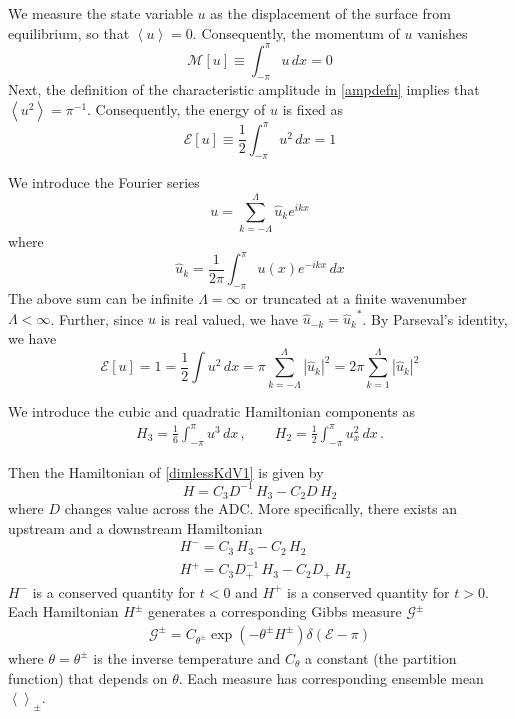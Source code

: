 \documentclass[11pt]{article}
\newcommand{\abs}[1]{\left| #1 \right|}
\newcommand{\mean}[1]{\left< #1 \right>}
\newcommand{\dx}{\, dx}
\newcommand{\drat}{D}
\newcommand{\dratdn}{\drat_+}
\newcommand{\En}{\mathcal{E}}
\newcommand{\Mo}{\mathcal{M}}
\newcommand{\uhat}{\hat{u}}
\newcommand{\Ham}{H}
\newcommand{\Hup}{\Ham^{-}}
\newcommand{\Hdn}{\Ham^{+}}
\newcommand{\Hupdn}{\Ham^{\pm}}
\newcommand{\Gibbs}{\mathcal{G}}
\newcommand{\Gupdn}{\Gibbs^{\pm}}
\newcommand{\thupdn}{\theta^{\pm}}
\begin{document}
We measure the state variable $u$ as the displacement of the surface from equilibrium, so that $\mean{u} = 0$. Consequently, the momentum of $u$ vanishes
\begin{equation}
\Mo[u] \equiv \int_{-\pi}^{\pi} u \dx = 0
\end{equation}
Next, the definition of the characteristic amplitude in \eqref{ampdefn} implies that $\mean{u^2} = \pi^{-1}$. Consequently, the energy of $u$ is fixed as
\begin{equation}
\En[u] \equiv \frac{1}{2} \int_{-\pi}^{\pi} u^2 \dx = 1
\end{equation}

We introduce the Fourier series
\begin{equation}
u = \sum_{k=-\Lambda}^{\Lambda} \uhat_k e^{i k x}
\end{equation}
where
\begin{equation}
\uhat_k = \frac{1}{2 \pi} \int_{-\pi}^{\pi} u(x) e^{-i k x} \dx
\end{equation}
The above sum can be infinite $\Lambda = \infty$ or truncated at a finite wavenumber $\Lambda < \infty$.
Further, since $u$ is real valued, we have $\uhat_{-k} = {\uhat_{k}}^*$.
By Parseval's identity, we have
\begin{equation}
\En[u] = 1 = \frac{1}{2} \int u^2 \dx = \pi \sum_{k=-\Lambda}^{\Lambda} \abs{\uhat_k}^2 = 2 \pi \sum_{k=1}^{\Lambda} \abs{\uhat_k}^2
\end{equation}


We introduce the cubic and quadratic Hamiltonian components as
\begin{align}
H_3 = \frac{1}{6} \int_{-\pi}^{\pi} u^3 \dx	\, , \qquad
H_2 = \frac{1}{2} \int_{-\pi}^{\pi} u_x^2 \dx	\, .
\end{align}

Then the Hamiltonian of \eqref{dimlessKdV1} is given by
\begin{equation}
\Ham = C_3 \drat^{-1} \, H_3 - C_2 \drat \, H_2
\end{equation}
where $\drat$ changes value across the ADC. More specifically, there exists an upstream and a downstream Hamiltonian
\begin{align}
&\Hup = C_3 \, H_3 - C_2 \, H_2 \\
&\Hdn = C_3 \dratdn^{-1} \, H_3 - C_2 \dratdn \, H_2
\end{align}
$\Hup$ is a conserved quantity for $t<0$ and $\Hdn$ is a conserved quantity for $t>0$. Each Hamiltonian $\Ham^{\pm}$ generates a corresponding Gibbs measure $\Gupdn$ 
\begin{align}
\Gupdn = C_{\thupdn} \exp(-\thupdn \Hupdn) \delta(\En - \pi)
\end{align}
where $\theta = \thupdn$ is the inverse temperature and $C_{\theta}$ a constant (the partition function) that depends on $\theta$. Each measure has corresponding ensemble mean $\mean{}_{\pm}$. 
\end{document}

